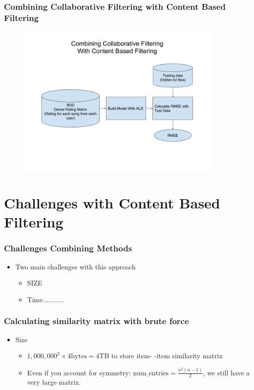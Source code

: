 \documentclass[11pt]{beamer}
\begin{document}
  \begin{frame}
    \frametitle{Combining Collaborative Filtering with Content Based Filtering}
    \begin{figure}[h]
      \centering
      \includegraphics[width=4in]{figures/collab_plus_content.png}
      \label{fig:collab_plus_content.png}
    \end{figure}
  \end{frame}


  \section{Challenges with Content Based Filtering}
  \begin{frame}
    \frametitle{Challenges Combining Methods}
    \begin{itemize}
      \item Two main challenges with this approach
        \begin{itemize}
          \item SIZE
          \item Time...........
        \end{itemize}
    \end{itemize}
  \end{frame}

  \begin{frame}
    \frametitle{Calculating similarity matrix with brute force}
    \begin{itemize}
      \item Size
        \begin{itemize}
          \item $1,000,000^2 \times 4\text{bytes} = 4\text{TB}$ to store item-
          -item similarity matrix
          \item Even if you account for symmetry: $\text{num\_entries} = \frac{n^2(n-1)}{2}$, 
          we still have a very large matrix.
        \end{itemize}
    \end{itemize}
  \end{frame}
\end{document}
